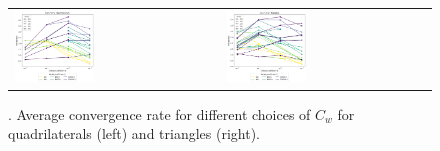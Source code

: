 \begin{figure}[h!]
\centering
\begin{tabular}{p{} p{}}
	\vspace{0pt}
	\includegraphics[width=0.4\textwidth]{../figs/parametric/advdiff_2D/ord_quarteroni2_2_4}
	&
	\vspace{0pt}
	\includegraphics[width=0.4\textwidth]{../figs/parametric/advdiff_2D/ord_quarteroni2_2_3}
\end{tabular}
\caption{. Average convergence rate for different choices of $C_w$ for
quadrilaterals (left) and triangles (right).}
\label{fig:orders_quarteroni2}
\end{figure}

